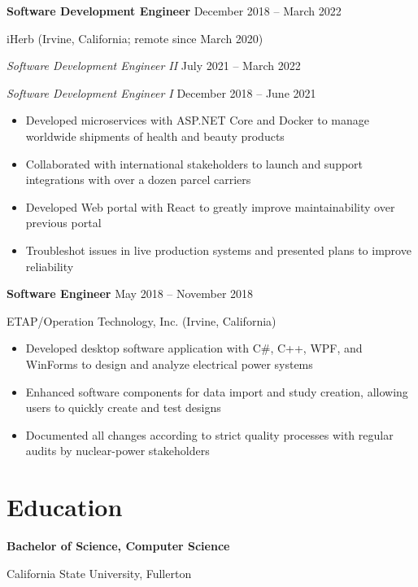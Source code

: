 \documentclass[11pt]{article}
\newcommand{\titleheader}[2]{\textbf{#1} \symbol{"B7} #2}
\newcommand{\secondaryheader}[2]{\hspace{0.25in} \textit{#1} \symbol{"B7} #2}
\newcommand{\locheader}[2]{#1 (#2)}
\begin{document}
	\titleheader{Software Development Engineer}{December 2018 -- March 2022}

	\locheader{iHerb}{Irvine, California; remote since March 2020}

	\secondaryheader{Software Development Engineer II}{July 2021 -- March 2022}

	\secondaryheader{Software Development Engineer I}{December 2018 -- June 2021}

	\begin{itemize}
		\item Developed microservices with ASP.NET Core and Docker to manage worldwide shipments of health and beauty products
		\item Collaborated with international stakeholders to launch and support integrations with over a dozen parcel carriers
		\item Developed Web portal with React to greatly improve maintainability over previous portal
		\item Troubleshot issues in live production systems and presented plans to improve reliability
	\end{itemize}

	\titleheader{Software Engineer}{May 2018 -- November 2018}

	\locheader{ETAP/Operation Technology, Inc.}{Irvine, California}

	\begin{itemize}
		\item Developed desktop software application with C\#, C++, WPF, and WinForms to design and analyze electrical power systems
		\item Enhanced software components for data import and study creation, allowing users to quickly create and test designs
		\item Documented all changes according to strict quality processes with regular audits by nuclear-power stakeholders
	\end{itemize}

	\section*{Education}

	\textbf{Bachelor of Science, Computer Science}

	California State University, Fullerton
\end{document}
